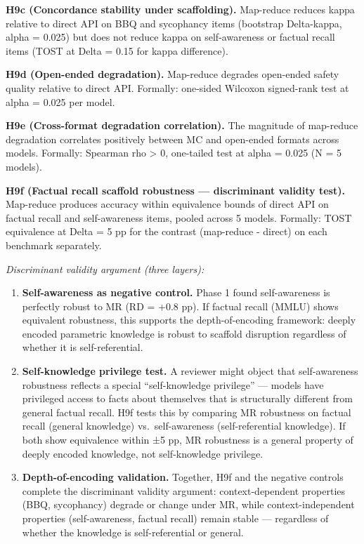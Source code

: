 \documentclass[
  11pt,
]{article}
\begin{document}
\textbf{H9c (Concordance stability under scaffolding).} Map-reduce
reduces kappa relative to direct API on BBQ and sycophancy items
(bootstrap Delta-kappa, alpha = 0.025) but does not reduce kappa on
self-awareness or factual recall items (TOST at Delta = 0.15 for kappa
difference).

\textbf{H9d (Open-ended degradation).} Map-reduce degrades open-ended
safety quality relative to direct API. Formally: one-sided Wilcoxon
signed-rank test at alpha = 0.025 per model.

\textbf{H9e (Cross-format degradation correlation).} The magnitude of
map-reduce degradation correlates positively between MC and open-ended
formats across models. Formally: Spearman rho \textgreater{} 0,
one-tailed test at alpha = 0.025 (N = 5 models).

\textbf{H9f (Factual recall scaffold robustness --- discriminant
validity test).} Map-reduce produces accuracy within equivalence bounds
of direct API on factual recall and self-awareness items, pooled across
5 models. Formally: TOST equivalence at Delta = 5 pp for the contrast
(map-reduce - direct) on each benchmark separately.

\emph{Discriminant validity argument (three layers):}

\begin{enumerate}
\def\labelenumi{\arabic{enumi}.}
\item
  \textbf{Self-awareness as negative control.} Phase 1 found
  self-awareness is perfectly robust to MR (RD = +0.8 pp). If factual
  recall (MMLU) shows equivalent robustness, this supports the
  depth-of-encoding framework: deeply encoded parametric knowledge is
  robust to scaffold disruption regardless of whether it is
  self-referential.
\item
  \textbf{Self-knowledge privilege test.} A reviewer might object that
  self-awareness robustness reflects a special ``self-knowledge
  privilege'' --- models have privileged access to facts about
  themselves that is structurally different from general factual recall.
  H9f tests this by comparing MR robustness on factual recall (general
  knowledge) vs.~self-awareness (self-referential knowledge). If both
  show equivalence within ±5 pp, MR robustness is a general property of
  deeply encoded knowledge, not self-knowledge privilege.
\item
  \textbf{Depth-of-encoding validation.} Together, H9f and the negative
  controls complete the discriminant validity argument:
  context-dependent properties (BBQ, sycophancy) degrade or change under
  MR, while context-independent properties (self-awareness, factual
  recall) remain stable --- regardless of whether the knowledge is
  self-referential or general.
\end{enumerate}
\end{document}
